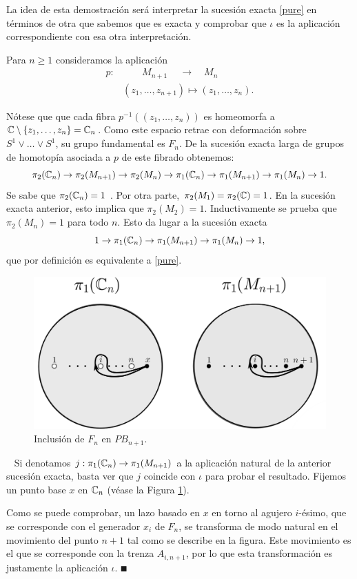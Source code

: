 \documentclass[TFG.tex]{subfiles}
\begin{document}
\begin{dem}
La idea de esta demostración será interpretar la sucesión exacta \ref{pure} en términos de otra que sabemos que es exacta y comprobar que $\iota$ es la aplicación correspondiente con esa otra interpretación.

Para $n\geq 1$ consideramos la aplicación
\begin{align}\label{fibrado}
p: & \qquad M_{n+1}\ \quad \longrightarrow\quad M_n\\
&(z_1,\dots,z_{n+1})\mapsto (z_1,\dots,z_n).\nonumber
\end{align} 

Nótese que que cada fibra $p^{-1}((z_1,\dots, z_n))$ es homeomorfa a $\mathbb{C}\setminus\{z_1,\dots, z_n\}=\mathbb{C}_n$. Como este espacio retrae con deformación sobre $S^1\lor\dots\lor S^1$, su grupo fundamental es $F_n$. De la sucesión exacta larga de grupos de homotopía asociada a $p$ de este fibrado \cite{Hatcher} obtenemos:
$$\pi_2(\mathbb{C}_n)\to\pi_2(M_{n+1})\to\pi_2(M_n)\to\pi_1(\mathbb{C}_n)\to\pi_1(M_{n+1})\to\pi_1(M_n)\to 1.$$
Se sabe que $\pi_2(\mathbb{C}_n)=1$ \cite{Hatcher}. Por otra parte, $\pi_2(M_1)=\pi_2(\mathbb{C})={1}$. En la sucesión exacta anterior, esto implica que $\pi_2(M_2)=1$. Inductivamente se prueba que $\pi_2(M_n)=1$ para todo $n$. Esto da lugar a la sucesión exacta
$$1\to\pi_1(\mathbb{C}_n)\to\pi_1(M_{n+1})\to\pi_1(M_n)\to 1,$$
que por definición es equivalente a \ref{pure}. 


\begin{figure}[h!]
\includegraphics[scale=0.4]{Imagenes/inclusion.png}
\caption{Inclusión de $F_n$ en $PB_{n+1}$.}\label{inclusion}
\end{figure}\
Si denotamos $j:\pi_1(\mathbb{C}_n)\to\pi_1(M_{n+1})$ a la aplicación natural de la anterior sucesión exacta, basta ver que $j$ coincide con $\iota$ para probar el resultado. Fijemos un punto base $x$ en $\mathbb{C}_n$ (véase la Figura \ref{inclusion}).

Como se puede comprobar, un lazo basado en $x$ en torno al agujero $i$-ésimo, que se corresponde con el generador $x_i$ de $F_n$, se transforma de modo natural en el movimiento del punto $n+1$ tal como se describe en la figura. Este movimiento es el que se corresponde con la trenza $A_{i,n+1}$, por lo que esta transformación es justamente la aplicación $\iota$. $\QED$
\end{dem}
\end{document}
